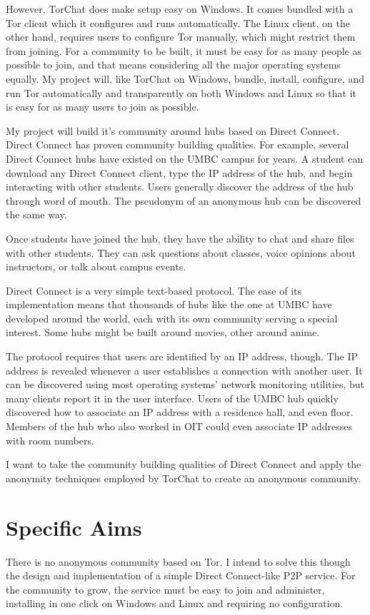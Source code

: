 \documentclass{article}
\begin{document}
However, TorChat does make setup easy on Windows.  It comes bundled with a Tor client which it configures and runs automatically.  The Linux client, on the other hand, requires users to configure Tor manually, which might restrict them from joining.  For a community to be built, it must be easy for as many people as possible to join, and that means considering all the major operating systems equally.  My project will, like TorChat on Windows, bundle, install, configure, and run Tor automatically and transparently on both Windows and Linux so that it is easy for as many users to join as possible.

My project will build it's community around hubs based on Direct Connect.  Direct Connect has proven community building qualities.  For example, several Direct Connect hubs have existed on the UMBC campus for years.  A student can download any Direct Connect client, type the IP address of the hub, and begin interacting with other students.  Users generally discover the address of the hub through word of mouth.  The pseudonym of an anonymous hub can be discovered the same way.

Once students have joined the hub, they have the ability to chat and share files with other students.  They can ask questions about classes, voice opinions about instructors, or talk about campus events.

Direct Connect is a very simple text-based protocol.  The ease of its implementation means that thousands of hubs like the one at UMBC have developed around the world, each with its own community serving a special interest.  Some hubs might be built around movies, other around anime.

The protocol requires that users are identified by an IP address, though.  The IP address is revealed whenever a user establishes a connection with another user.  It can be discovered using most operating systems' network monitoring utilities, but many clients report it in the user interface.  Users of the UMBC hub quickly discovered how to associate an IP address with a residence hall, and even floor.  Members of the hub who also worked in OIT could even associate IP addresses with room numbers.

I want to take the community building qualities of Direct Connect and apply the anonymity techniques employed by TorChat to create an anonymous community.

\section{Specific Aims}
There is no anonymous community based on Tor.  I intend to solve this though the design and implementation of a simple Direct Connect-like P2P service.  For the community to grow, the service must be easy to join and administer, installing in one click on Windows and Linux and requiring no configuration.
\end{document}
